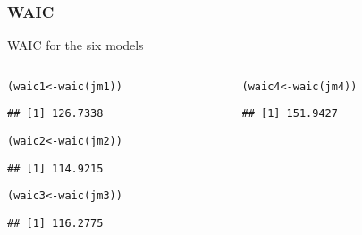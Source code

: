 \documentclass[color=usenames,dvipsnames]{beamer}\usepackage[]{graphicx}\usepackage[]{xcolor}
\makeatletter
\newcommand{\hlstd}[1]{\textcolor[rgb]{0,0,0}{#1}}%
\newcommand{\hlkwb}[1]{\textcolor[rgb]{0,0.341,0.682}{#1}}%
\newcommand{\hlkwd}[1]{\textcolor[rgb]{0.004,0.004,0.506}{#1}}%
\newenvironment{kframe}{%
 \def\at@end@of@kframe{}%
 \ifinner\ifhmode%
  \def\at@end@of@kframe{\end{minipage}}%
  \begin{minipage}{\columnwidth}%
 \fi\fi%
 \def\FrameCommand##1{\hskip\@totalleftmargin \hskip-\fboxsep
 \colorbox{shadecolor}{##1}\hskip-\fboxsep
     \hskip-\linewidth \hskip-\@totalleftmargin \hskip\columnwidth}%
 \MakeFramed {\advance\hsize-\width
   \@totalleftmargin\z@ \linewidth\hsize
   \@setminipage}}%
 {\par\unskip\endMakeFramed%
 \at@end@of@kframe}
\newenvironment{knitrout}{}{} %
\makeatother
\begin{document}
\begin{frame}[fragile]
  \frametitle{WAIC}
  WAIC for the six models
  \begin{columns}
    \begin{column}{0.5\textwidth}
\begin{knitrout}\scriptsize
{}\color{fgcolor}\begin{kframe}
\begin{alltt}
\hlstd{(waic1} \hlkwb{<-} \hlkwd{waic}\hlstd{(jm1))}
\end{alltt}
\begin{verbatim}
## [1] 126.7338
\end{verbatim}
\end{kframe}
\end{knitrout}
\begin{knitrout}\scriptsize
{}\color{fgcolor}\begin{kframe}
\begin{alltt}
\hlstd{(waic2} \hlkwb{<-} \hlkwd{waic}\hlstd{(jm2))}
\end{alltt}
\begin{verbatim}
## [1] 114.9215
\end{verbatim}
\end{kframe}
\end{knitrout}
\begin{knitrout}\scriptsize
{}\color{fgcolor}\begin{kframe}
\begin{alltt}
\hlstd{(waic3} \hlkwb{<-} \hlkwd{waic}\hlstd{(jm3))}
\end{alltt}
\begin{verbatim}
## [1] 116.2775
\end{verbatim}
\end{kframe}
\end{knitrout}
    \end{column}
    \begin{column}{0.5\textwidth}
\begin{knitrout}\scriptsize
{}\color{fgcolor}\begin{kframe}
\begin{alltt}
\hlstd{(waic4} \hlkwb{<-} \hlkwd{waic}\hlstd{(jm4))}
\end{alltt}
\begin{verbatim}
## [1] 151.9427
\end{verbatim}
\end{kframe}

\end{knitrout}
\end{column}
\end{columns}
\end{frame}
\end{document}
